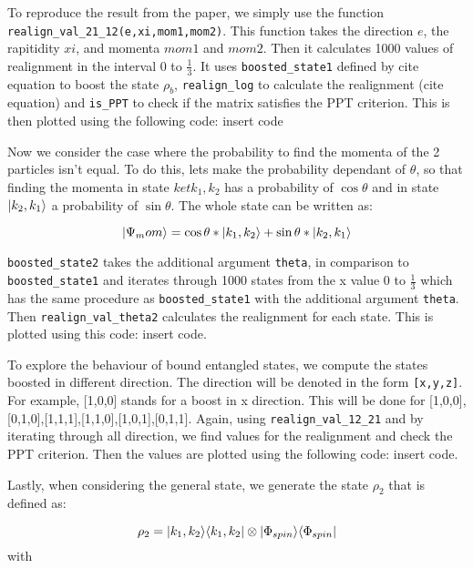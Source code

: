 

To reproduce the result from the paper, we simply use the function \verb|realign_val_21_12(e,xi,mom1,mom2)|.
This function takes the direction $e$, the rapitidity $xi$, and momenta $mom1$ and $mom2$. Then it calculates 1000
values of realignment in the interval 0 to $\frac{1}{3}$. It uses \verb|boosted_state1| defined by cite equation to boost
the state $\rho_b$, \verb|realign_log| to calculate the realignment (cite equation) and \verb|is_PPT| to check if the matrix 
satisfies the PPT criterion. This is then plotted using the following code: insert code

Now we consider the case where the probability to find the momenta of the 2 particles isn't equal. To do this, lets make the probability
dependant of $\theta$, so that finding the momenta in state $ket{k_1,k_2}$ has a probability of $\cos{\theta}$ and in state $\lvert k_2,k_1\rangle$
a probability of $\sin{\theta}$. The whole state can be written as:

\begin{equation}
    \lvert\Psi_mom\rangle = \cos{\theta}*\lvert k_1,k_2\rangle + \sin{\theta}*\lvert k_2,k_1\rangle
\end{equation}

\verb|boosted_state2| takes the additional argument \verb|theta|, in comparison to \verb|boosted_state1| and iterates through 1000 states from 
the x value 0 to $\frac{1}{3}$ which has the same procedure as \verb|boosted_state1| with the additional argument \verb|theta|. Then 
\verb|realign_val_theta2| calculates the realignment for each state. This is plotted using this code: insert code.

To explore the behaviour of bound entangled states, we compute the states boosted in different direction. The direction will be denoted in the form
\verb|[x,y,z]|. For example, [1,0,0] stands for a boost in x direction. This will be done for [1,0,0],[0,1,0],[1,1,1],[1,1,0],[1,0,1],[0,1,1]. 
Again, using \verb|realign_val_12_21| and by iterating through all direction, we find values for the realignment and check the PPT criterion. Then 
the values are plotted using the following code: insert code.

Lastly, when considering the general state, we generate the state $\rho_2$ that is defined as:

\begin{equation}
    \rho_2 = \lvert k_1,k_2\rangle\langle k_1,k_2\rvert \otimes \lvert\Phi_{spin}\rangle\langle\Phi_{spin}\rvert
\end{equation} with

